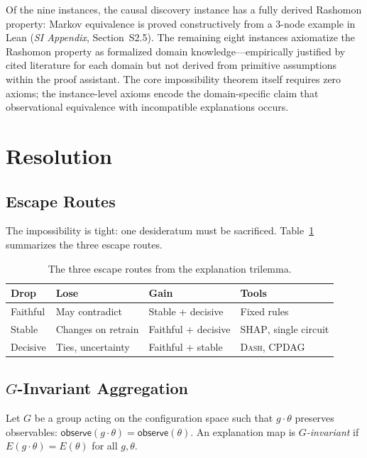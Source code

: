 \documentclass[twocolumn]{article}
\newcommand{\SHAP}{\textsc{SHAP}}
\newcommand{\DASH}{\textsc{Dash}}
\begin{document}
Of the nine instances, the causal discovery instance has a fully derived
Rashomon property: Markov equivalence is proved constructively from a
3-node example in Lean (\emph{SI Appendix}, Section~S2.5). The remaining
eight instances axiomatize the Rashomon property as formalized domain
knowledge---empirically justified by cited literature for each domain but
not derived from primitive assumptions within the proof assistant. The
core impossibility theorem itself requires zero axioms; the
instance-level axioms encode the domain-specific claim that
observational equivalence with incompatible explanations occurs.


\section{Resolution}
\label{sec:resolution}

\subsection{Escape Routes}

The impossibility is tight: one desideratum must be sacrificed. Table~\ref{tab:escape-routes} summarizes the three escape routes.

\begin{table}[t]
\centering
\caption{The three escape routes from the explanation trilemma.}
\label{tab:escape-routes}
\small
\begin{tabular}{@{}llll@{}}
\toprule
Drop & Lose & Gain & Tools \\
\midrule
Faithful & May contradict & Stable + decisive & Fixed rules \\
Stable   & Changes on retrain & Faithful + decisive & \SHAP{}, single circuit \\
Decisive & Ties, uncertainty  & Faithful + stable  & \DASH{}, CPDAG \\
\bottomrule
\end{tabular}
\end{table}

\subsection{$G$-Invariant Aggregation}

Let $G$ be a group acting on the configuration space such that $g \cdot
\theta$ preserves observables: $\mathsf{observe}(g \cdot \theta) =
\mathsf{observe}(\theta)$. An explanation map is \emph{$G$-invariant} if
$E(g \cdot \theta) = E(\theta)$ for all $g, \theta$.
\end{document}
